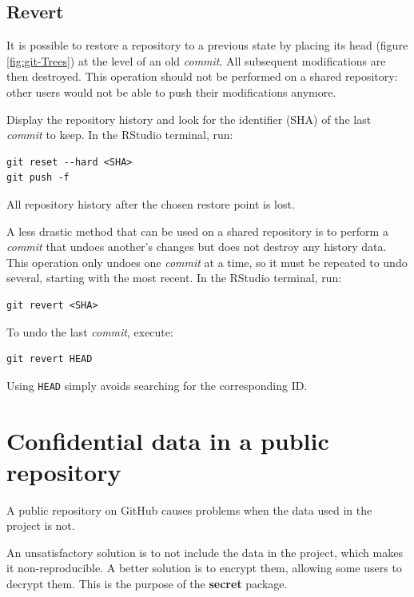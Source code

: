 \documentclass[
  12pt,
  american,
  a4paper,
  extrafontsizes,onecolumn,openright
  ]{memoir}
\newlength{\rf}
\begin{document}
\subsection{Revert}\label{revert-1}

It is possible to restore a repository to a previous state by placing its head (figure \ref{fig:git-Trees}) at the level of an old \emph{commit}.
All subsequent modifications are then destroyed.
This operation should not be performed on a shared repository: other users would not be able to push their modifications anymore.

Display the repository history and look for the identifier (SHA) of the last \emph{commit} to keep.
In the RStudio terminal, run:

\begin{verbatim}
git reset --hard <SHA>
git push -f
\end{verbatim}

All repository history after the chosen restore point is lost.

A less drastic method that can be used on a shared repository is to perform a \emph{commit} that undoes another's changes but does not destroy any history data.
This operation only undoes one \emph{commit} at a time, so it must be repeated to undo several, starting with the most recent.
In the RStudio terminal, run:

\begin{verbatim}
git revert <SHA>
\end{verbatim}

To undo the last \emph{commit}, execute:

\begin{verbatim}
git revert HEAD
\end{verbatim}

Using \texttt{HEAD} simply avoids searching for the corresponding ID.

\section{Confidential data in a public repository}\label{sec:confidential}

A public repository on GitHub causes problems when the data used in the project is not.

An unsatisfactory solution is to not include the data in the project, which makes it non-reproducible.
A better solution is to encrypt them, allowing some users to decrypt them.
This is the purpose of the \textbf{secret} package.
\end{document}
